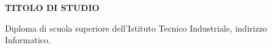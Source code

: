 \begin{minipage}[c]{0.3\textwidth}
	\textbf{TITOLO DI STUDIO}
\end{minipage}%
\hfill
\hfill
\begin{minipage}[t]{0.6\textwidth}		
	Diploma di scuola superiore dell'Istituto Tecnico Industriale, indirizzo Informatico. \vspace{2mm}\\
	\vspace{1mm}
\end{minipage}%
